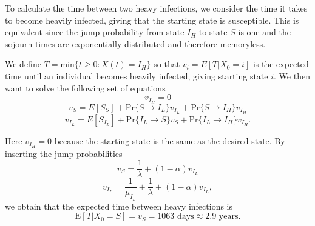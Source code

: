 To calculate the time between two heavy infections, we consider the time it takes to become heavily infected, giving that the starting state is susceptible. This is equivalent since the jump probability from state $I_H$ to state $S$ is one and the sojourn times are exponentially distributed and therefore memoryless.

We define $T = \text{min}\{t \geq 0 : X(t)=I_H\}$ so that $v_i = E\left[T|X_0 = i \right]$ is the expected time until an individual becomes heavily infected, giving starting state $i$. We then want to solve the following set of equations 
$$v_{I_H} = 0$$
$$v_{S} = E[S_S] + \text{Pr}\{S \rightarrow I_L\} v_{I_L}+ \text{Pr}\{S \rightarrow I_H\} v_{I_H} $$
$$v_{I_L} = E[S_{I_L}] + \text{Pr}\{I_L \rightarrow S\} v_S + \text{Pr}\{I_L \rightarrow I_H\} v_{I_H}. $$

Here $v_{I_H} = 0$ because the starting state is the same as the desired state. By inserting the jump probabilities 
$$ v_{S} = \frac{1}{\lambda} + (1-\alpha) v_{I_L} $$
$$ v_{I_L} =  \frac{1}{\mu_{I_L}}+  \frac{1}{\lambda} + (1-\alpha) v_{I_L}, $$
 we obtain that the expected time between heavy infections is
$$\text{E}\left[T|X_0=S \right] = v_S = 1063 \text{ days} \approx 2.9 \text{ years}.$$ 